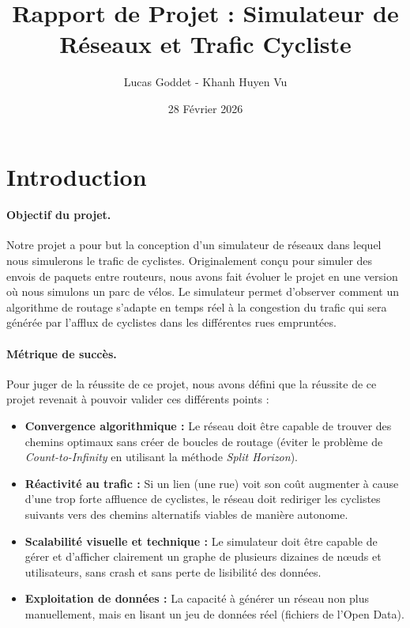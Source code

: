 \documentclass{article}
\title{%
  Rapport de Projet : Simulateur de Réseaux et Trafic Cycliste%
}
\author{Lucas Goddet - Khanh Huyen Vu}
\date{28 Février 2026}
\begin{document}
\maketitle

\section{Introduction}

\paragraph{Objectif du projet.}
Notre projet a pour but la conception d'un simulateur de réseaux dans lequel nous simulerons le trafic de cyclistes. Originalement conçu pour simuler des envois de paquets entre routeurs, nous avons fait évoluer le projet en une version où nous simulons un parc de vélos. Le simulateur permet d'observer comment un algorithme de routage s'adapte en temps réel à la congestion du trafic qui sera générée par l'afflux de cyclistes dans les différentes rues empruntées.

\paragraph{Métrique de succès.}
Pour juger de la réussite de ce projet, nous avons défini que la réussite de ce projet revenait à pouvoir valider ces différents points :
\begin{itemize}
    \item \textbf{Convergence algorithmique :} Le réseau doit être capable de trouver des chemins optimaux sans créer de boucles de routage (éviter le problème de \textit{Count-to-Infinity} en utilisant la méthode \textit{Split Horizon}).
    \item \textbf{Réactivité au trafic :} Si un lien (une rue) voit son coût augmenter à cause d'une trop forte affluence de cyclistes, le réseau doit rediriger les cyclistes suivants vers des chemins alternatifs viables de manière autonome.
    \item \textbf{Scalabilité visuelle et technique :} Le simulateur doit être capable de gérer et d'afficher clairement un graphe de plusieurs dizaines de nœuds et utilisateurs, sans crash et sans perte de lisibilité des données.
    \item \textbf{Exploitation de données :} La capacité à générer un réseau non plus manuellement, mais en lisant un jeu de données réel (fichiers de l'Open Data).
\end{itemize}
\end{document}
